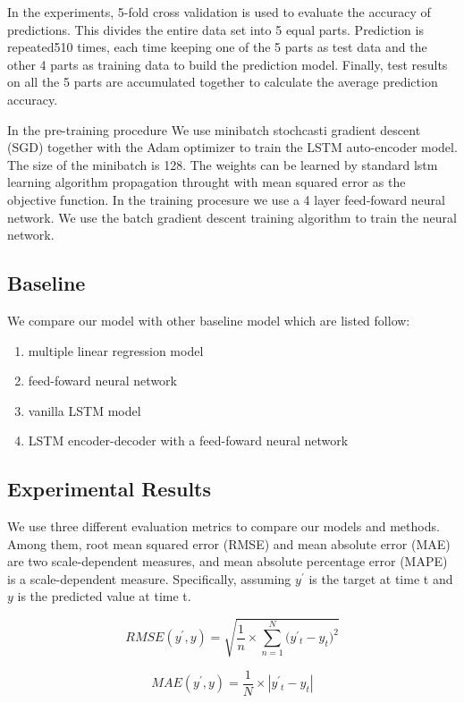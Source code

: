 \documentclass[5p]{elsarticle}
\begin{document}
In the experiments, 5-fold cross validation is used to evaluate the accuracy of predictions. This divides the entire data set into 5 equal parts.  Prediction is repeated510 times, each time keeping one of the 5 parts as test data and the other 4 parts as training data to build the prediction model. Finally, test results on all the 5 parts are accumulated together to calculate the average prediction accuracy.

In the pre-training procedure We use minibatch stochcasti gradient descent (SGD) together with the Adam optimizer to train the LSTM auto-encoder model. The size of the minibatch is 128. The weights can be learned by standard lstm learning algorithm propagation throught with mean squared error as the objective function. In the training procesure we use a 4 layer feed-foward neural network. We use the batch gradient descent training algorithm to train the neural network.

\subsection{Baseline}
We compare our model with other baseline model which are listed follow:
\begin{enumerate}
  \item multiple linear regression model
  \item feed-foward neural network
  \item vanilla LSTM model
  \item LSTM encoder-decoder with a feed-foward neural network
\end{enumerate}

\subsection{Experimental Results}

We use three different evaluation metrics to compare our models and methods. Among them, root mean squared error (RMSE) and mean absolute error (MAE) are two scale-dependent measures, and mean absolute percentage error (MAPE) is a scale-dependent measure. Specifically, assuming $y^'$ is the target at time t and $y$ is the predicted value at time t. 


\begin{equation}
    RMSE(y^{'},y)=\sqrt{\frac{1}{n}\times{\sum_{n=1}^N(y^{'}{_t}-y_t})^2}
\end{equation}

\begin{equation}
	 MAE(y^{'},y)=\frac{1}{N}\times\left| y^{'}{_t}-y_t \right|
\end{equation}
\end{document}
